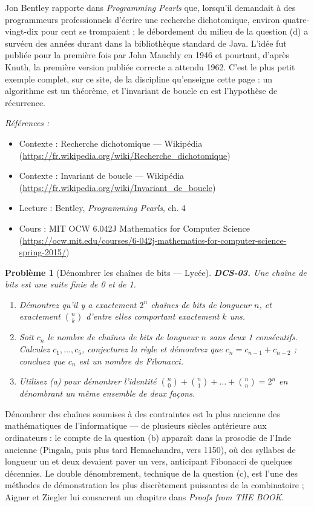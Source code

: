 \documentclass[11pt]{article}
\newtheorem{problem}{Problème}
\newenvironment{refs}{\par\small\noindent\emph{Références :}\begin{itemize}\setlength\itemsep{0pt}}{\end{itemize}\normalsize}
\begin{document}
\noindent Jon Bentley rapporte dans \textit{Programming Pearls} que, lorsqu'il demandait à des programmeurs professionnels d'écrire une recherche dichotomique, environ quatre-vingt-dix pour cent se trompaient ; le débordement du milieu de la question (d) a survécu des années durant dans la bibliothèque standard de Java. L'idée fut publiée pour la première fois par John Mauchly en 1946 et pourtant, d'après Knuth, la première version publiée correcte a attendu 1962. C'est le plus petit exemple complet, sur ce site, de la discipline qu'enseigne cette page : un algorithme est un théorème, et l'invariant de boucle en est l'hypothèse de récurrence.

\begin{refs}
\item Contexte : Recherche dichotomique --- Wikipédia (\url{https://fr.wikipedia.org/wiki/Recherche_dichotomique})
\item Contexte : Invariant de boucle --- Wikipédia (\url{https://fr.wikipedia.org/wiki/Invariant_de_boucle})
\item Lecture : Bentley, \textit{Programming Pearls}, ch. 4
\item Cours : MIT OCW 6.042J Mathematics for Computer Science (\url{https://ocw.mit.edu/courses/6-042j-mathematics-for-computer-science-spring-2015/})
\end{refs}

\bigskip

\begin{problem}[{Dénombrer les chaînes de bits --- Lycée}]
\textbf{DCS-03.} Une chaîne de bits est une suite finie de 0 et de 1.
\begin{enumerate}
\item[(a)] Démontrez qu'il y a exactement $2^n$ chaînes de bits de longueur $n$, et exactement $\binom{n}{k}$ d'entre elles comportant exactement $k$ uns.
\item[(b)] Soit $c_n$ le nombre de chaînes de bits de longueur $n$ sans deux 1 consécutifs. Calculez $c_1, \dots, c_5$, conjecturez la règle et démontrez que $c_n = c_{n-1} + c_{n-2}$ ; concluez que $c_n$ est un nombre de Fibonacci.
\item[(c)] Utilisez (a) pour démontrer l'identité $\binom{n}{0} + \binom{n}{1} + \dots + \binom{n}{n} = 2^n$ en dénombrant un même ensemble de deux façons.
\end{enumerate}

\end{problem}

\noindent Dénombrer des chaînes soumises à des contraintes est la plus ancienne des mathématiques de l'informatique --- de plusieurs siècles antérieure aux ordinateurs : le compte de la question (b) apparaît dans la prosodie de l'Inde ancienne (Pingala, puis plus tard Hemachandra, vers 1150), où des syllabes de longueur un et deux devaient paver un vers, anticipant Fibonacci de quelques décennies. Le double dénombrement, technique de la question (c), est l'une des méthodes de démonstration les plus discrètement puissantes de la combinatoire ; Aigner et Ziegler lui consacrent un chapitre dans \textit{Proofs from THE BOOK}.
\end{document}
